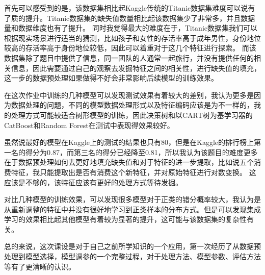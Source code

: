 \documentclass[../main.tex]{subfiles}
\begin{document}
    首先可以感受到的是，该数据集相比起Kaggle传统的Titanic数据集难度可以说有了质的提升。Titanic数据集的缺失值数量相比起该数据集少了非常多，并且数据量和数据维度也有了提升。
    同时我觉得最大的难度在于，Titanic数据集我们可以根据现实场景进行适当的猜测，比如孩子和女性的存活率高于成年男性，身份地位较高的存活率高于身份地位较低，因此可以着重对于这几个特征进行探索。
    而该数据集除了题目中提供了信息，同一团队的人通常一起旅行，并没有提供任何的相关信息，因此需要通过自己的观察去发掘特征之间的相关性，进行缺失值的填充，这一步的数据预处理如果做得不好会非常影响后续模型的训练效果。

    在这次作业中训练的几种模型可以发现测试效果有着较大的差别，我认为更多是因为数据处理的问题，不同的模型数据处理形式以及特征编码应该是为不一样的，我的处理方式可能较适合树形模型的训练，因此决策树和以CART树为基学习器的CatBoost和Random Forest在测试中表现得效果较好。

    虽然说最好的模型在Kaggle上的测试的结果也只有80，但是在Kaggle的排行榜上第一名的得分为0.87，而第三名的得分已经降至0.81，所以我认为该题目的难度更多在于数据预处理如何去更好地填充缺失值和对于特征的进一步提取，比如说五个消费特征，我只能提取出是否有消费这个新特征，并对原始特征进行对数变换。
    这应该是不够的，该特征应该有更好的处理方式等待发掘。

    对比几种模型的训练效果，可以发现很多模型对于正类的错分概率较大，我认为是从重新调整的特征中并没有很好地学习到正类样本的分布方式。但是可以发现集成学习的效果相比起其他模型有着较为显著的提升，这可能与该数据集的复杂性有关。

    总的来说，这次课设是对于自己之前所学知识的一个应用，第一次经历了从数据预处理到模型选择，模型调参的一个完整过程，对于处理方法、模型参数、评估方法等有了更清晰的认识。
\end{document}
